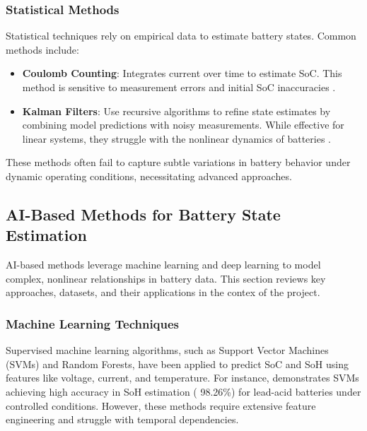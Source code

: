 \subsubsection{Statistical Methods}
Statistical techniques rely on empirical data to estimate battery states. Common methods include:
\begin{itemize}
    \item \textbf{Coulomb Counting}: Integrates current over time to estimate SoC. This method is sensitive to measurement errors and initial SoC inaccuracies \cite{Report}.
    \item \textbf{Kalman Filters}: Use recursive algorithms to refine state estimates by combining model predictions with noisy measurements. While effective for linear systems, they struggle with the nonlinear dynamics of batteries \cite{Report}.
\end{itemize}

These methods often fail to capture subtle variations in battery behavior under dynamic operating conditions, necessitating advanced approaches.

\subsection{AI-Based Methods for Battery State Estimation}
AI-based methods leverage machine learning and deep learning to model complex, nonlinear relationships in battery data. This section reviews key approaches, datasets, and their applications in the contex of the project.

\subsubsection{Machine Learning Techniques}
Supervised machine learning algorithms, such as Support Vector Machines (SVMs) and Random Forests, have been applied to predict SoC and SoH using features like voltage, current, and temperature. For instance, \cite{sun_simultaneous_2022} demonstrates SVMs achieving high accuracy in SoH estimation ( 98.26\%) for lead-acid batteries under controlled conditions. However, these methods require extensive feature engineering and struggle with temporal dependencies.

